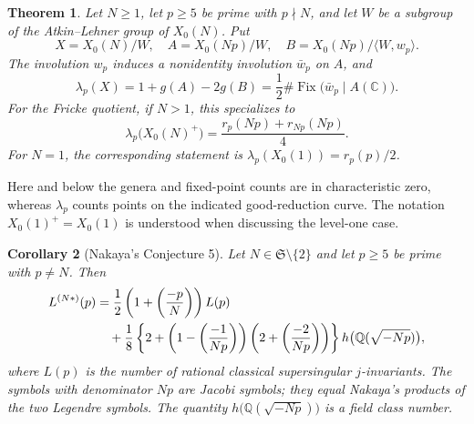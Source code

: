 \documentclass[11pt,a4paper]{article}
\newtheorem{theorem}{Theorem}[section]
\newtheorem{corollary}[theorem]{Corollary}
\theoremstyle{remark}\newtheorem{remark}[theorem]{Remark}
\numberwithin{equation}{section}
\newcommand{\Q}{\mathbb Q}\newcommand{\Z}{\mathbb Z}
\newcommand{\C}{\mathbb C}\newcommand{\Fp}{\mathbb F_p}
\newcommand{\Fix}{\operatorname{Fix}}
\newcommand{\leg}[2]{\left(\frac{#1}{#2}\right)}
\newcommand{\hK}[1]{h\bigl(\Q(\sqrt{-#1})\bigr)}
\begin{document}
\begin{theorem}\label{thm:main}
Let $N\geq1$, let $p\geq5$ be prime with $p\nmid N$, and let $W$ be a subgroup of the Atkin--Lehner group of $X_0(N)$. Put
\[
X=X_0(N)/W,\quad A=X_0(Np)/W,\quad
B=X_0(Np)/\langle W,w_p\rangle.
\]
The involution $w_p$ induces a nonidentity involution $\bar w_p$ on $A$, and
\begin{equation}\label{eq:general}
\lambda_p(X)=1+g(A)-2g(B)
=\frac12\#\Fix\bigl(\bar w_p\mid A(\C)\bigr).
\end{equation}
For the Fricke quotient, if $N>1$, this specializes to
\begin{equation}\label{eq:fricke}
\lambda_p\bigl(X_0(N)^+\bigr)
=\frac{r_p(Np)+r_{Np}(Np)}4.
\end{equation}
For $N=1$, the corresponding statement is $\lambda_p(X_0(1))=r_p(p)/2$.
\end{theorem}

Here and below the genera and fixed-point counts are in characteristic zero, whereas $\lambda_p$ counts points on the indicated good-reduction curve. The notation $X_0(1)^+=X_0(1)$ is understood when discussing the level-one case.

\begin{corollary}[Nakaya's Conjecture 5]\label{cor:nakaya}
Let $N\in\mathfrak S\setminus\{2\}$ and let $p\geq5$ be prime with $p\ne N$. Then
\begin{align}
L^{(N*)}(p)
&=\frac12\left(1+\leg{-p}{N}\right)L(p)\notag\\
&\quad+\frac18\left\{2+\left(1-\leg{-1}{Np}\right)
\left(2+\leg{-2}{Np}\right)\right\}\hK{Np},\label{eq:nakaya}
\end{align}
where $L(p)$ is the number of rational classical supersingular $j$-invariants. The symbols with denominator $Np$ are Jacobi symbols; they equal Nakaya's products of the two Legendre symbols. The quantity $\hK{Np}$ is a field class number.
\end{corollary}
\end{document}
